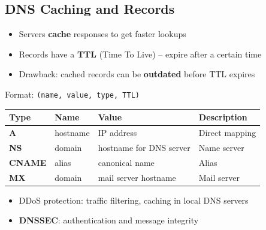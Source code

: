 \begin{imagebox}
\end{imagebox}

\subsection{DNS Caching and Records}

\begin{keybox}
\begin{itemize}[noitemsep]
    \item Servers \textbf{cache} responses to get faster lookups
    \item Records have a \textbf{TTL} (Time To Live) -- expire after a certain time
    \item Drawback: cached records can be \textbf{outdated} before TTL expires
\end{itemize}
\end{keybox}

\begin{keybox}
Format: \texttt{(name, value, type, TTL)}

\begin{tabular}{llll}
\toprule
\textbf{Type} & \textbf{Name} & \textbf{Value} & \textbf{Description} \\
\midrule
\textbf{A} & hostname & IP address & Direct mapping \\
\textbf{NS} & domain & hostname for DNS server & Name server \\
\textbf{CNAME} & alias & canonical name & Alias \\
\textbf{MX} & domain & mail server hostname & Mail server \\
\bottomrule
\end{tabular}
\end{keybox}

\begin{keybox}
\begin{itemize}[noitemsep]
    \item DDoS protection: traffic filtering, caching in local DNS servers
    \item \textbf{DNSSEC}: authentication and message integrity
\end{itemize}
\end{keybox}


